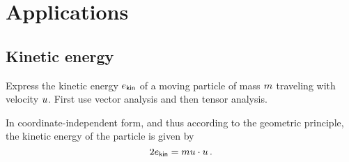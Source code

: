 
\section{Applications}
%
\subsection{Kinetic energy}
%
\begin{example}
  Express the kinetic energy $e_\text{\textsf{kin}}$ of a moving particle of mass $m$ traveling with velocity $u$. First use vector analysis and then tensor analysis.
\end{example}
%
In coordinate-independent form, and thus according to the geometric principle, the kinetic energy of the particle is given by
%
\begin{equation}\label{eq:kineticenergyinvariant}
  2e_\text{\textsf{kin}} = mu\cdot u\,.
\end{equation}
%
